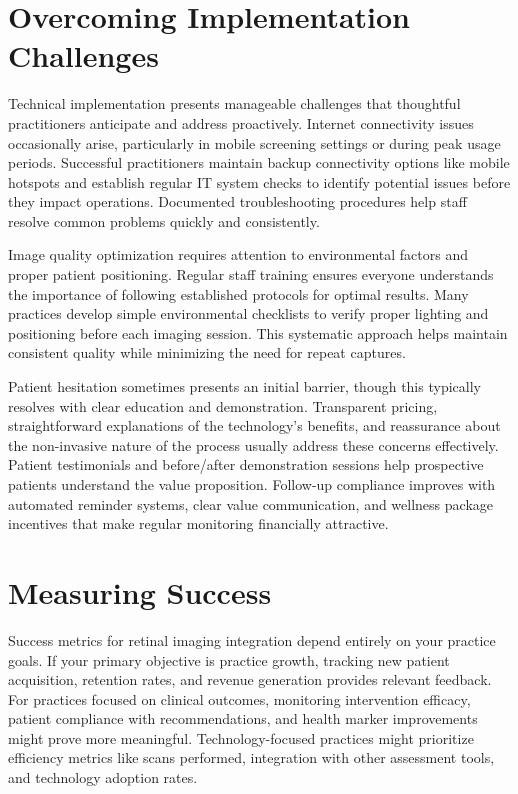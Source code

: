 \documentclass[
  Letterpaper,
]{scrbook}
\begin{document}
\section{Overcoming Implementation
Challenges}\label{overcoming-implementation-challenges}

Technical implementation presents manageable challenges that thoughtful
practitioners anticipate and address proactively. Internet connectivity
issues occasionally arise, particularly in mobile screening settings or
during peak usage periods. Successful practitioners maintain backup
connectivity options like mobile hotspots and establish regular IT
system checks to identify potential issues before they impact
operations. Documented troubleshooting procedures help staff resolve
common problems quickly and consistently.

Image quality optimization requires attention to environmental factors
and proper patient positioning. Regular staff training ensures everyone
understands the importance of following established protocols for
optimal results. Many practices develop simple environmental checklists
to verify proper lighting and positioning before each imaging session.
This systematic approach helps maintain consistent quality while
minimizing the need for repeat captures.

Patient hesitation sometimes presents an initial barrier, though this
typically resolves with clear education and demonstration. Transparent
pricing, straightforward explanations of the technology's benefits, and
reassurance about the non-invasive nature of the process usually address
these concerns effectively. Patient testimonials and before/after
demonstration sessions help prospective patients understand the value
proposition. Follow-up compliance improves with automated reminder
systems, clear value communication, and wellness package incentives that
make regular monitoring financially attractive.

\section{Measuring Success}\label{measuring-success}

Success metrics for retinal imaging integration depend entirely on your
practice goals. If your primary objective is practice growth, tracking
new patient acquisition, retention rates, and revenue generation
provides relevant feedback. For practices focused on clinical outcomes,
monitoring intervention efficacy, patient compliance with
recommendations, and health marker improvements might prove more
meaningful. Technology-focused practices might prioritize efficiency
metrics like scans performed, integration with other assessment tools,
and technology adoption rates.
\end{document}
